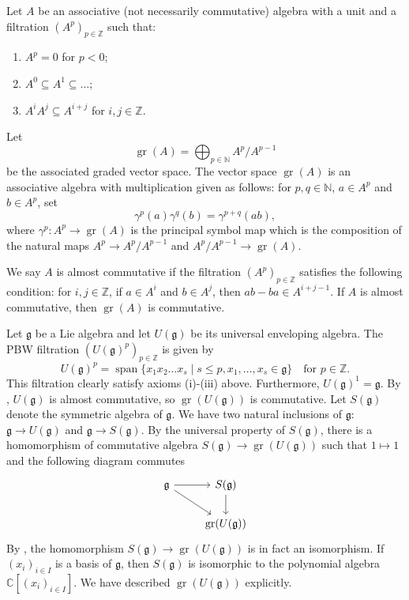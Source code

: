 \documentclass[a4paper, 12pt, reqno]{amsart}
\theoremstyle{remark}
\numberwithin{equation}{subsection}
\DeclareMathOperator{\gr}{gr}
\DeclareMathOperator{\vspan}{span}
\begin{document}
Let $A$ be an associative (not necessarily commutative) algebra with a unit and a filtration $(A^p)_{p \in \mathbb{Z}}$ such that:
\begin{enumerate}
\item $A^p = 0$ for $p < 0$;
\item $A^0 \subseteq A^1 \subseteq \dots$;
\item $A^iA^j \subseteq A^{i + j}$ for $i, j \in \mathbb{Z}$.
\end{enumerate}
Let
\begin{equation*}
  \gr(A) = \bigoplus_{p \in \mathbb{N}}A^p/A^{p - 1}
\end{equation*}
be the associated graded vector space.
The vector space $\gr(A)$ is an associative algebra with multiplication given as follows: for $p, q \in \mathbb{N}$, $a \in A^p$ and $b \in A^p$, set
\begin{equation*}
  \gamma^p(a)\gamma^q(b) = \gamma^{p + q}(ab),
\end{equation*}
where $\gamma^p: A^p \to \gr(A)$  is the principal symbol map which is the composition of the natural maps $A^p \to A^p/A^{p - 1}$ and $A^p/A^{p - 1} \to \gr(A)$.

We say $A$ is almost commutative if the filtration $(A^p)_{p \in \mathbb{Z}}$ satisfies the following condition: for $i, j \in \mathbb{Z}$, if $a \in A^i$ and $b \in A^j$, then $ab - ba \in A^{i + j -1}$.
If $A$ is almost commutative, then $\gr(A)$ is commutative.

Let $\mathfrak{g}$ be a Lie algebra and let $U(\mathfrak{g})$ be its universal enveloping algebra.
The PBW filtration $(U(\mathfrak{g})^p)_{p \in \mathbb{Z}}$ is given by
\begin{equation*}
  U(\mathfrak{g})^p = \vspan\{x_1x_2\dots x_s \mid s\le p, x_1, \dots, x_s \in \mathfrak{g}\} \quad \text{for }p \in \mathbb{Z}.
\end{equation*}
This filtration clearly satisfy axioms (i)-(iii) above.
Furthermore, $U(\mathfrak{g})^1 = \mathfrak{g}$.
By \cite[Lemma 2.1.5]{dixmier_enveloping_1996}, $U(\mathfrak{g})$ is almost commutative, so $\gr(U(\mathfrak{g}))$ is commutative.
Let $S(\mathfrak{g})$ denote the symmetric algebra of $\mathfrak{g}$.
We have two natural inclusions of $\mathfrak{g}$: $\mathfrak{g} \to U(\mathfrak{g})$ and $\mathfrak{g} \to S(\mathfrak{g})$.
By the universal property of $S(\mathfrak{g})$, there is a homomorphism of commutative algebra $S(\mathfrak{g}) \to \gr(U(\mathfrak{g}))$ such that $1 \mapsto 1$ and the following diagram commutes
\begin{equation*}
  \begin{tikzcd}
    \mathfrak{g} \arrow[r] \arrow[rd] & S(\mathfrak{g}) \arrow[d] \\
    & \gr(U(\mathfrak{g}))      
  \end{tikzcd}
\end{equation*}
By \cite[Proposition 2.3.6]{dixmier_enveloping_1996}, the homomorphism $S(\mathfrak{g}) \to \gr(U(\mathfrak{g}))$ is in fact an isomorphism.
If $(x_i)_{i \in I}$ is a basis of $\mathfrak{g}$, then $S(\mathfrak{g})$ is isomorphic to the polynomial algebra $\mathbb{C}[(x_i)_{i \in I}]$.
We have described $\gr(U(\mathfrak{g}))$ explicitly.
\end{document}
